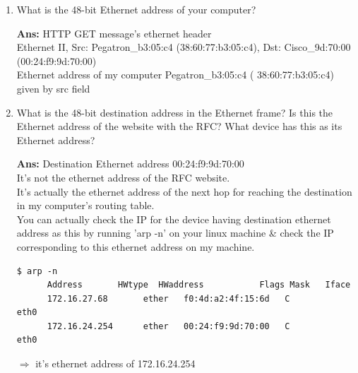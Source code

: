 \documentclass[a4,11pt]{article}
\newenvironment{que}
{ \color{ForestGreen}
  \begin{question}
}
{ \end{question} }
\newenvironment{sol}
{ \color{Black}
  \begin{solution}
}
{ \end{solution} }
\begin{document}
\begin{enumerate}
  \item 
  \begin{que}
   What is the 48-bit Ethernet address of your computer?
  \end{que}

  \begin{sol}
    \textbf{Ans:} HTTP GET message's ethernet header \\
      Ethernet II, Src: Pegatron\_b3:05:c4 (38:60:77:b3:05:c4), Dst: Cisco\_9d:70:00 (00:24:f9:9d:70:00) \\
      Ethernet address of my computer	 Pegatron\_b3:05:c4 ( 38:60:77:b3:05:c4) given by src field
  \end{sol}

  
   \item
   \begin{que}
    What is the 48-bit destination address in the Ethernet frame? 
    Is this the Ethernet address of the website with the RFC?  What device has this as its Ethernet address?
   \end{que}

   \begin{sol}
      \textbf{Ans:} Destination Ethernet address 		00:24:f9:9d:70:00	\\

      It's not the ethernet address of the RFC website. \\
      It's actually the ethernet address of the next hop for reaching the destination in my computer's routing table. \\

      You can actually check the IP for the device having destination ethernet address as this by 
      running 'arp -n' on your linux machine \& check the IP corresponding to this ethernet address on my machine.
    \begin{adjustwidth}{-2cm}{}
      \begin{lstlisting}[style=bash]
      $ arp -n
      Address     	HWtype  HWaddress           Flags Mask   Iface
      172.16.27.68       ether   f0:4d:a2:4f:15:6d   C            eth0
      172.16.24.254      ether   00:24:f9:9d:70:00   C            eth0
      \end{lstlisting}
      \end{adjustwidth}
      
      $\Rightarrow$ it's ethernet address of 172.16.24.254
   \end{sol}


\end{enumerate}
\end{document}
